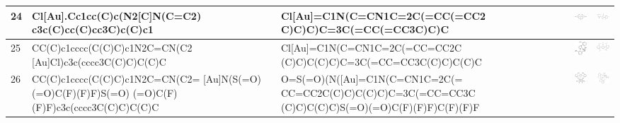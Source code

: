 \begin{landscape}
\begin{longtable}{m{0.3cm}m{6.7cm}m{7.7cm}m{2.3cm}m{2.3cm}}
 24 &
 Cl[Au].Cc1cc(C)c(N2[C]N(C=C2) c3c(C)cc(C)cc3C)c(C)c1 & 
 Cl[Au]=C1N(C=CN1C=2C(=CC(=CC2 C)C)C)C=3C(=CC(=CC3C)C)C & 
 \includegraphics[width=2.2cm]{imagenes/sigmaAldrich/pdf/[(IMes)AuCl].pdf} & 
 \includegraphics[width=2.2cm]{imagenes/sciFinder/pdf/[(IMes)AuCl].pdf} \\
\hline


 25 &
 CC(C)c1cccc(C(C)C)c1N2C=CN(C2 [Au]Cl)c3c(cccc3C(C)C)C(C)C & 
 Cl[Au]=C1N(C=CN1C=2C(=CC=CC2C (C)C)C(C)C)C=3C(=CC=CC3C(C)C)C(C)C & 
 \includegraphics[width=2.2cm]{imagenes/sigmaAldrich/[(IPr)AuCl].png} & 
 \includegraphics[width=2.2cm]{imagenes/sciFinder/pdf/[(IPr)AuCl].pdf} \\
\hline

 26 &
 CC(C)c1cccc(C(C)C)c1N2C=CN(C2= [Au]N(S(=O)(=O)C(F)(F)F)S(=O) (=O)C(F)(F)F)c3c(cccc3C(C)C)C(C)C & 
 O=S(=O)(N([Au]=C1N(C=CN1C=2C(= CC=CC2C(C)C)C(C)C)C=3C(=CC=CC3C (C)C)C(C)C)S(=O)(=O)C(F)(F)F)C(F)(F)F & 
 \includegraphics[width=2.1cm]{imagenes/sigmaAldrich/IPrAuNTf2.png} & 
 \includegraphics[width=2.2cm]{imagenes/sciFinder/pdf/IPrAuNTf2.pdf} \\
\hline


\end{longtable}
\end{landscape}
